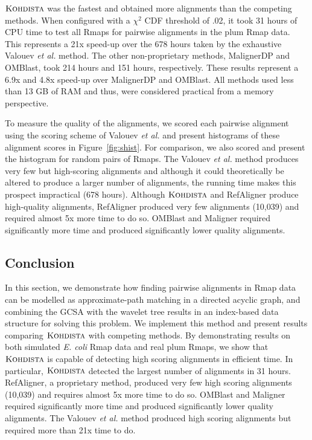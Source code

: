 $\mbox{\rm \textsc{Kohdista}}$ was the fastest and  obtained more alignments than the competing methods.  When configured with a $\chi^2$ CDF threshold of .02, it took 31 hours of CPU time to test all Rmaps for pairwise alignments in the plum Rmap data.  This represents a 21x speed-up over the 678 hours taken by the exhaustive Valouev {\it et al.} method.  The other non-proprietary methods, MalignerDP and OMBlast, took 214 hours and 151 hours, respectively.   These results represent a 6.9x and 4.8x speed-up over MalignerDP and OMBlast. All methods used less than 13 GB of RAM and thus, were considered practical from a memory perspective.

To measure the quality of the alignments, we scored each  pairwise alignment using the scoring scheme of Valouev {\it et al.} and present histograms of these alignment scores in Figure~\ref{fig:shist}.  For comparison, we also scored and present the histogram for random pairs of Rmaps. The Valouev {\it et al.} method produces very few but high-scoring alignments and although it could theoretically be altered to produce a larger number of alignments, the running time makes this prospect impractical (678 hours).  Although $\mbox{\rm \textsc{Kohdista}}$ and RefAligner produce high-quality alignments, RefAligner produced very few alignments (10,039) and required almost 5x more time to do so. OMBlast and Maligner required significantly more time and produced significantly lower quality alignments.


\subsection{Conclusion}

In this section, we demonstrate how finding pairwise alignments in Rmap data can be modelled as approximate-path matching in a directed acyclic graph, and combining the GCSA with the wavelet tree results in an index-based data structure for solving this problem. We implement this method and present results comparing $\mbox{\rm \textsc{Kohdista}}$ with competing methods.  By demonstrating results on both  simulated \emph{E. coli} Rmap data and real plum Rmaps, we show that $\mbox{\rm \textsc{Kohdista}}$ is capable of detecting high scoring alignments in efficient time.  In particular, $\mbox{\rm \textsc{Kohdista}}$ detected the largest number of alignments in 31 hours. RefAligner, a proprietary method, produced very few high scoring alignments (10,039) and requires almost 5x more time to do so. OMBlast and Maligner required significantly more time and produced significantly lower quality alignments. The Valouev {\it et al.} method produced high scoring alignments but required more than 21x time to do.







